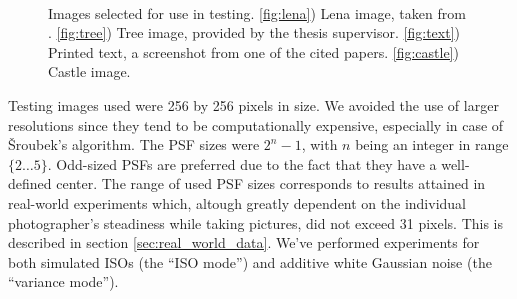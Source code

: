 \documentclass[12pt,notitlepage]{report}
\begin{document}
\begin{figure}[htb]
  \centering
	  ~
	  ~
	  ~
  \caption[Images selected for use in testing]{Images selected for use in testing. \ref{fig:lena}) Lena image, taken from  \cite{uscimgdb}. \ref{fig:tree}) Tree image, provided by the thesis supervisor. \ref{fig:text}) Printed text, a screenshot from one of the cited papers. \ref{fig:castle}) Castle image.}
  \label{fig:used_images}
\end{figure}



Testing images used were 256 by 256 pixels in size. We avoided the use of larger resolutions since they tend to be computationally expensive, especially in case of Šroubek's algorithm. The PSF sizes were $2^n - 1$, with $n$ being an integer in range $\lbrace 2 \dots 5 \rbrace$. Odd-sized PSFs are preferred due to the fact that they have a well-defined center. The range of used PSF sizes corresponds to results attained in real-world experiments which, altough greatly dependent on the individual photographer's steadiness while taking pictures,  did not exceed 31 pixels. This is described in section \ref{sec:real_world_data}. We've performed experiments for both simulated ISOs (the ``ISO mode'') and additive white Gaussian noise  (the ``variance mode'').
\end{document}
